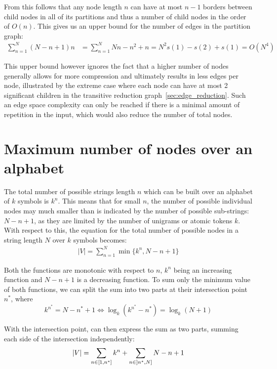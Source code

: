 From this follows that any node length $n$ can have at most $n-1$ borders between child nodes in all of its partitions and thus a number of child nodes in the order of $O(n)$. This gives us an upper bound for the number of edges in the partition graph:
\begin{align*}
\sum_{n=1}^{N}{(N - n + 1)n} &= \sum_{n=1}^{N}{Nn - n^2 + n} = N^2s(1) - s(2) + s(1) = O(N^4)
\end{align*}

This upper bound however ignores the fact that a higher number of nodes generally allows for more compression and ultimately results in less edges per node, illustrated by the extreme case where each node can have at most 2 significant children in the transitive reduction graph~\ref{sec:edge_reduction}. Such an edge space complexity can only be reached if there is a minimal amount of repetition in the input, which would also reduce the number of total nodes.

\section{Maximum number of nodes over an alphabet}

The total number of possible strings length $n$ which can be built over an alphabet of $k$ symbols is $k^n$. This means that for small $n$, the number of possible individual nodes may much smaller than is indicated by the number of possible sub-strings: $N - n + 1$, as they are limited by the number of unigrams or atomic tokens $k$. With respect to this, the equation for the total number of possible nodes in a string length $N$ over $k$ symbols becomes:
\begin{align*}
    |V| = \sum_{n=1}^N{\min\{k^n, N - n + 1\}}
\end{align*}

\noindent
Both the functions are monotonic with respect to $n$, $k^n$ being an increasing function and $N - n + 1$ is a decreasing function.
\newpage
\noindent
To sum only the minimum value of both functions, we can split the sum into two parts at their intersection point $n^*$, where
\begin{equation} \label{eq:1}
    k^{n^*} = N - n^* + 1 \Leftrightarrow \log_k(k^{n^*} - n^*) = \log_k(N + 1)
\end{equation}

With the intersection point, can then express the sum as two parts, summing each side of the intersection independently:
\begin{align} \label{eq:2}
    |V| = \sum_{n \in \interval{1}{n^*}}{k^n} + \sum_{n \in \interval[open left]{n^*}{N}}{N - n + 1}
\end{align}

